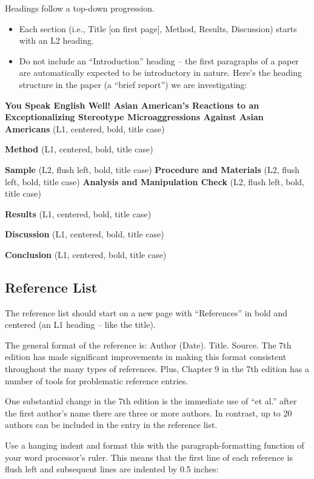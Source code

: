 \documentclass[
  11pt,
]{book}
\providecommand{\tightlist}{%
  \setlength{\itemsep}{0pt}\setlength{\parskip}{0pt}}
\begin{document}
Headings follow a top-down progression.

\begin{itemize}
\tightlist
\item
  Each section (i.e., Title {[}on first page{]}, Method, Results, Discussion) starts with an L2 heading.
\item
  Do not include an ``Introduction'' heading -- the first paragraphs of a paper are automatically expected to be introductory in nature.
  Here's the heading structure in the paper (a ``brief report'') we are investigating:
\end{itemize}

\textbf{You Speak English Well! Asian American's Reactions to an Exceptionalizing Stereotype Microaggressions Against Asian Americans} (L1, centered, bold, title case)

\textbf{Method} (L1, centered, bold, title case)

\textbf{Sample} (L2, flush left, bold, title case)
\textbf{Procedure and Materials} (L2, flush left, bold, title case)
\textbf{Analysis and Manipulation Check} (L2, flush left, bold, title case)

\textbf{Results} (L1, centered, bold, title case)

\textbf{Discussion} (L1, centered, bold, title case)

\textbf{Conclusion} (L1, centered, bold, title case)

\hypertarget{reference-list}{%
\subsection{Reference List}\label{reference-list}}

The reference list should start on a new page with ``References'' in bold and centered (an L1 heading -- like the title).

The general format of the reference is: Author (Date). Title. Source. The 7th edition has made significant improvements in making this format consistent throughout the many types of references. Plus, Chapter 9 in the 7th edition has a number of tools for problematic reference entries.

One substantial change in the 7th edition is the immediate use of ``et al.'' after the first author's name there are three or more authors. In contrast, up to 20 authors can be included in the entry in the reference list.

Use a hanging indent and format this with the paragraph-formatting function of your word processor's ruler. This means that the first line of each reference is flush left and subsequent lines are indented by 0.5 inches:
\end{document}
